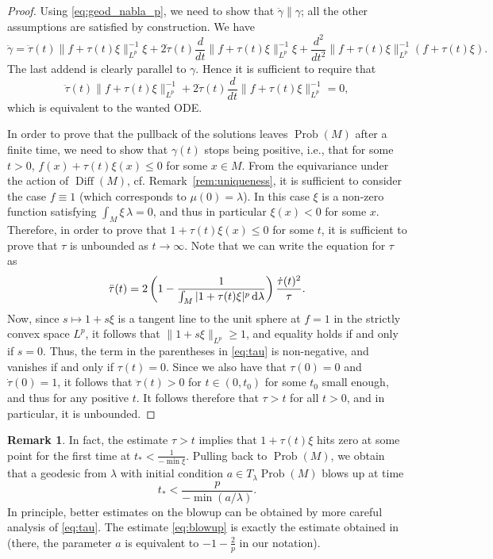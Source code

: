 \documentclass[11pt]{amsart}
\theoremstyle{definition}
\newtheorem{remark}[theorem]{Remark}
\newcommand{\dx}{\lambda}
\newcommand{\Prob}{\operatorname{Prob}(M)}
\newcommand{\Diff}{\operatorname{Diff}(M)}
\newcommand{\ud}{\textup{d}}
\begin{document}
\begin{proof}
    Using \eqref{eq:geod_nabla_p}, we need to show that $\ddot\gamma \parallel\gamma$; all the other assumptions are satisfied by construction.
    We have
    \[
    \ddot\gamma = \ddot\tau(t)\|f+\tau(t)\xi\|_{L^p}^{-1}\xi + 2\dot\tau(t)\frac{d}{dt}\|f+\tau(t)\xi\|_{L^p}^{-1}\xi + \frac{d^2}{dt^2}\|f+\tau(t)\xi\|_{L^p}^{-1}(f + \tau(t)\xi).
    \]
    The last addend is clearly parallel to $\gamma$.
    Hence it is sufficient to require that
    \[
   \ddot\tau(t)\|f+\tau(t)\xi\|_{L^p}^{-1} + 2\dot\tau(t)\frac{d}{dt}\|f+\tau(t)\xi\|_{L^p}^{-1} = 0,
    \]
    which is equivalent to the wanted ODE.

    In order to prove that the pullback of the solutions leaves $\Prob$ after a finite time, we need to show that $\gamma(t)$ stops being positive, i.e., that for some $t>0$, $f(x) + \tau(t)\xi(x) \le 0$ for some $x\in M$.
    From the equivariance under the action of $\Diff$, cf. Remark~\ref{rem:uniqueness}, it is sufficient to consider the case $f\equiv 1$ (which corresponds to $\mu(0)=\dx$).
    In this case $\xi$ is a non-zero function satisfying $\int_M \xi \,\dx= 0$, and thus in particular $\xi(x) <0$ for some $x$.
    Therefore, in order to prove that $1 + \tau(t)\xi(x) \le 0$ for some $t$, it is sufficient to prove that $\tau$ is unbounded as $t\to \infty$.
    Note that we can write the equation for $\tau$ as
    \begin{equation}\label{eq:tau}
    \ddot\tau(t) = 2\left(1-\frac{1}{\int_M|1 + \tau(t) \xi|^p\,\ud\dx}\right)\frac{\dot\tau(t)^2}{\tau}.
    \end{equation}
    Now, since $s\mapsto 1 + s\xi$ is a tangent line to the unit sphere at $f=1$ in the strictly convex space $L^p$, it follows that $\|1+s\xi\|_{L^p} \ge 1$, and equality holds if and only if $s=0$.
    Thus, the term in the parentheses in \eqref{eq:tau} is non-negative, and vanishes if and only if $\tau(t) = 0$.
    Since we also have that $\tau(0)=0$ and $\dot\tau(0)=1$, it follows that $\ddot\tau(t) > 0$ for $t\in (0,t_0)$ for some $t_0$ small enough, and thus for any positive $t$.
    It follows therefore that $\tau > t$ for all $t>0$, and in particular, it is unbounded.
\end{proof}

\begin{remark}
In fact, the estimate $\tau>t$ implies that $1+\tau(t) \xi$ hits zero at some point for the first time at $t_* < \frac{1}{-\min \xi}$.
Pulling back to $\Prob$, we obtain that a geodesic from $\dx$ with initial condition $a\in T_\dx\Prob$ blows up at time 
\begin{equation}\label{eq:blowup}
t_* < \frac{p}{-\min(a/\dx)}.
\end{equation}
In principle, better estimates on the blowup can be obtained by more careful analysis of \eqref{eq:tau}.
The estimate \eqref{eq:blowup} is exactly the estimate obtained in \cite[Formula (78)]{kogelbauer2020global} (there, the parameter $a$ is equivalent to $-1-\frac{2}{p}$ in our notation).
\end{remark}
\end{document}
